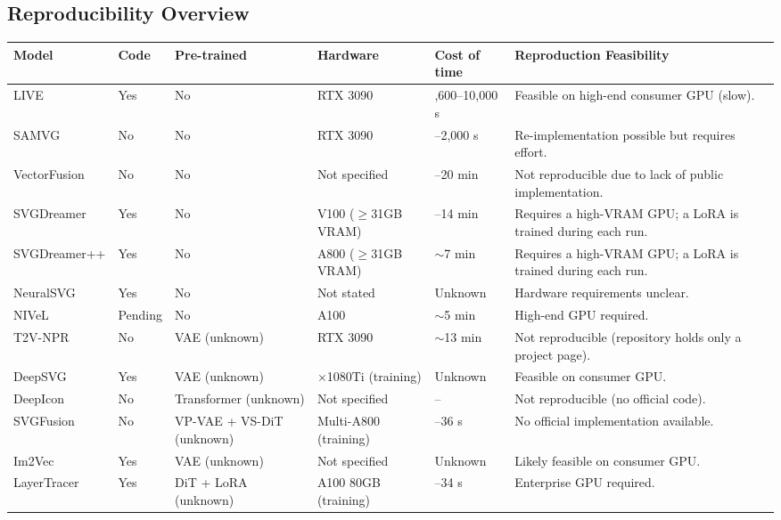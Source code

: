 \begin{landscape}
\section{Reproducibility Overview}
\label{app:reproducibility}

\begin{center}
\small
{}
\label{tab:app_reproducibility}
\begin{tabularx}{\linewidth}{>{\raggedright\arraybackslash}p{2.85cm} >{\raggedright\arraybackslash}p{1.52cm} >{\raggedright\arraybackslash}p{3.33cm} >{\raggedright\arraybackslash}p{3.19cm} >{\raggedright\arraybackslash}p{2.75cm} >{\raggedright\arraybackslash}X}
\toprule
\textbf{Model} & \textbf{Code} & \textbf{Pre-trained} & \textbf{Hardware} & \textbf{Cost of time} & \textbf{Reproduction Feasibility} \\
\midrule
LIVE & Yes & No & RTX 3090 & 2,600--10,000 s & Feasible on high-end consumer GPU (slow). \\
SAMVG & No & No & RTX 3090 & 139--2,000 s & Re-implementation possible but requires effort. \\
VectorFusion & No & No & Not specified & 10--20 min & Not reproducible due to lack of public implementation. \\
SVGDreamer & Yes & No & V100 ($\geq$31GB VRAM) & 7--14 min & Requires a high-VRAM GPU; a LoRA is trained during each run. \\
SVGDreamer++ & Yes & No & A800 ($\geq$31GB VRAM) & $\sim$7 min & Requires a high-VRAM GPU; a LoRA is trained during each run. \\
NeuralSVG & Yes & No & Not stated & Unknown & Hardware requirements unclear. \\
NIVeL & Pending & No & A100 & $\sim$5 min & High-end GPU required. \\
T2V-NPR & No & VAE (unknown)& RTX 3090 & $\sim$13 min & Not reproducible (repository holds only a project page). \\
DeepSVG & Yes & VAE (unknown) & 2×1080Ti (training) & Unknown & Feasible on consumer GPU. \\
DeepIcon & No & Transformer (unknown) & Not specified & -- & Not reproducible (no official code). \\
SVGFusion & No & VP-VAE + VS-DiT (unknown) & Multi-A800 (training) & 24--36 s & No official implementation available. \\
Im2Vec & Yes & VAE (unknown) & Not specified & Unknown & Likely feasible on consumer GPU. \\
LayerTracer & Yes & DiT + LoRA (unknown) & A100 80GB (training) & 27--34 s & Enterprise GPU required. \\
\bottomrule
\end{tabularx}
\end{center}
\end{landscape}

